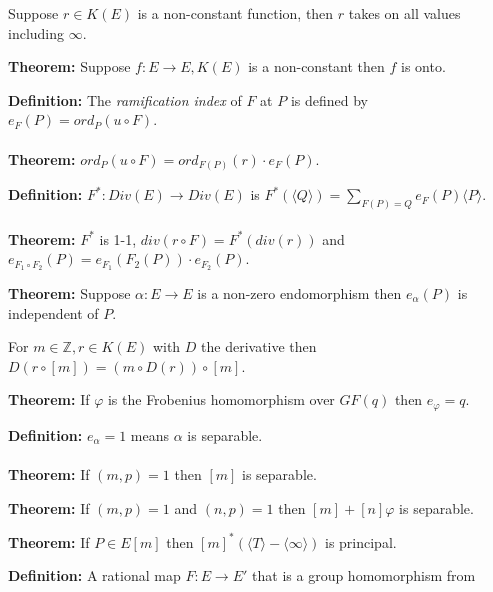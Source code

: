 Suppose $r \in K(E)$ is a non-constant function, then $r$ takes on all values
including $\infty$.
\begin{quote}
\end{quote}
{\bf Theorem:} 
Suppose $f: E \rightarrow E, K(E)$ is a non-constant then $f$ is onto.
\begin{quote}
\end{quote}
{\bf Definition:} The \emph{ramification index} of $F$ at $P$ is defined by
$e_F(P)= ord_P(u \circ F)$.
\\
\\
{\bf Theorem:} 
$ord_P(u \circ F) = ord_{F(P)}(r) \cdot e_F(P)$.
\begin{quote}
\end{quote}
{\bf Definition:} 
$F^*: Div(E) \rightarrow Div(E)$ is 
$F^*( \langle Q \rangle)= \sum_{F(P)=Q} e_F(P) \langle P \rangle$.
\\
\\
{\bf Theorem:} 
$F^*$ is 1-1, $div(r \circ F)= F^*(div(r))$ and
$ e_{F_1 \circ F_2}(P)= e_{F_1}(F_2(P)) \cdot e_{F_2}(P)$.
\begin{quote}
\end{quote}
{\bf Theorem:} 
Suppose $\alpha: E \rightarrow E$ is a non-zero endomorphism then
$e_{\alpha}(P)$ is independent of $P$.
\begin{quote}
\end{quote}
For $m \in {\mathbb Z}, r \in K(E)$ with $D$ the derivative then
$D(r \circ [m])= (m \circ D(r)) \circ [m]$.
\begin{quote}
\end{quote}
{\bf Theorem:} 
If $\varphi$ is the Frobenius homomorphism over $GF(q)$ then $e_{\varphi}= q$.
\begin{quote}
\end{quote}
{\bf Definition:} 
$e_{\alpha}=1$ means $\alpha$ is separable.
\\
\\
{\bf Theorem:} 
If $(m,p)=1$ then $[m]$ is separable.
\begin{quote}
\end{quote}
{\bf Theorem:} 
If $(m,p)=1$ and $(n,p)=1$ then $[m]+[n] \varphi$ is separable.
\begin{quote}
\end{quote}
{\bf Theorem:} 
If $P \in E[m]$ then $[m]^*( \langle T \rangle - \langle \infty \rangle)$
is principal.
\begin{quote}
\end{quote}
{\bf Definition:} 
A rational map $F: E \rightarrow E'$ that is a group homomorphism from
